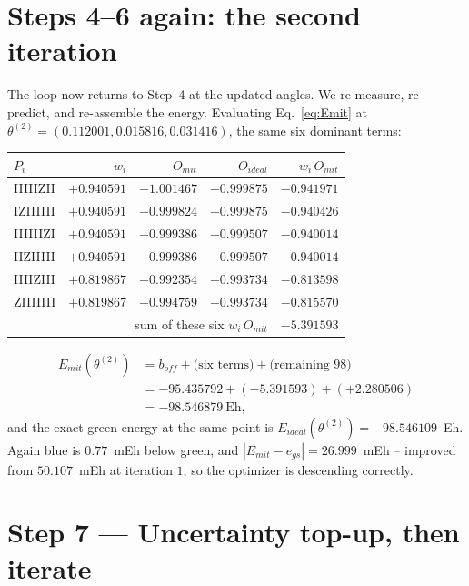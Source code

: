 \documentclass[11pt]{article}
\def\bm#1{#1}%
\def\texttt#1{#1}%
\def\mathrm#1{#1}%
\newcommand{\Emit}{E_{\mathrm{mit}}}
\newcommand{\Eideal}{E_{\mathrm{ideal}}}
\newcommand{\egs}{e_{\mathrm{gs}}}
\newcommand{\boff}{b_{\mathrm{off}}}
\begin{document}
\section{Steps 4--6 again: the second iteration}
\label{sec:iter2}

The loop now returns to Step~4 at the updated angles. We re-measure, re-predict,
and re-assemble the energy. Evaluating Eq.~\eqref{eq:Emit} at
$\bm\theta^{(2)}=(0.112001,0.015816,0.031416)$, the same six dominant terms:

\begin{center}
\renewcommand{\arraystretch}{1.15}
\begin{tabular}{@{}lrrrr@{}}
\toprule
$P_i$ & $w_i$ & $O_{\mathrm{mit}}$ & $O_{\mathrm{ideal}}$ & $w_i\,O_{\mathrm{mit}}$ \\
\midrule
\texttt{IIIIIZII} & $+0.940591$ & $-1.001467$ & $-0.999875$ & $-0.941971$ \\
\texttt{IZIIIIII} & $+0.940591$ & $-0.999824$ & $-0.999875$ & $-0.940426$ \\
\texttt{IIIIIIZI} & $+0.940591$ & $-0.999386$ & $-0.999507$ & $-0.940014$ \\
\texttt{IIZIIIII} & $+0.940591$ & $-0.999386$ & $-0.999507$ & $-0.940014$ \\
\texttt{IIIIZIII} & $+0.819867$ & $-0.992354$ & $-0.993734$ & $-0.813598$ \\
\texttt{ZIIIIIII} & $+0.819867$ & $-0.994759$ & $-0.993734$ & $-0.815570$ \\
\midrule
\multicolumn{4}{r}{sum of these six $w_i\,O_{\mathrm{mit}}$} & $-5.391593$ \\
\bottomrule
\end{tabular}
\end{center}

\[
\begin{aligned}
\Emit(\bm\theta^{(2)})
&=\boff+\big(\text{six terms}\big)+\big(\text{remaining }98\big)\\
&=-95.435792+(-5.391593)+(+2.280506)\\
&=\boxed{-98.546879~\text{Eh},}
\end{aligned}
\]
and the exact green energy at the same point is
$\Eideal(\bm\theta^{(2)})=-98.546109$~Eh. Again blue is $0.77$~mEh below green,
and $|\Emit-\egs|=26.999$~mEh -- improved from $50.107$~mEh at iteration $1$, so
the optimizer is descending correctly.

\section{Step 7 --- Uncertainty top-up, then iterate}
\label{sec:reading}
\end{document}
